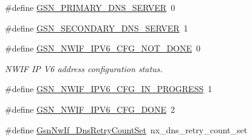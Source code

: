 \begin{DoxyCompactItemize}
\item 
\#define \hyperlink{a00534_a62b7215b2b6aafb8cba4f699ff6e1369}{GSN\_\-PRIMARY\_\-DNS\_\-SERVER}~0
\item 
\#define \hyperlink{a00534_aba4c680932594158782a3e4771a41dd3}{GSN\_\-SECONDARY\_\-DNS\_\-SERVER}~1
\item 
\#define \hyperlink{a00670_ga758c2a6db263eed36e543de3fa913fc3}{GSN\_\-NWIF\_\-IPV6\_\-CFG\_\-NOT\_\-DONE}~0
\begin{DoxyCompactList}\small\item\em NWIF IP V6 address configuration status. \end{DoxyCompactList}\item 
\#define \hyperlink{a00534_a880d7fa81ce0646c0643b532796ef39f}{GSN\_\-NWIF\_\-IPV6\_\-CFG\_\-IN\_\-PROGRESS}~1
\item 
\#define \hyperlink{a00534_ad9ffe591a47d210792ccadcdabdf14d1}{GSN\_\-NWIF\_\-IPV6\_\-CFG\_\-DONE}~2
\item 
\#define \hyperlink{a00534_a70c487092384608962401dd2bef50b2a}{GsnNwIf\_\-DnsRetryCountSet}~nx\_\-dns\_\-retry\_\-count\_\-set
\end{DoxyCompactItemize}
